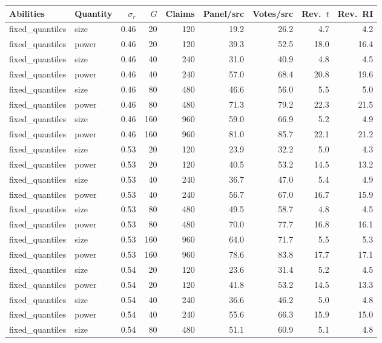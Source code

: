 \begin{table}[p]
\centering\scriptsize
\setlength{\tabcolsep}{4pt}
\begin{tabular}{@{}llrrrrrrr@{}}
\toprule
Abilities & Quantity & $\sigma_r$ & $G$ & Claims & Panel/src & Votes/src & Rev.\ $t$ & Rev.\ RI \\
\midrule
fixed\_quantiles & size & 0.46 & 20 & 120 & 19.2 & 26.2 & 4.7 & 4.2 \\
fixed\_quantiles & power & 0.46 & 20 & 120 & 39.3 & 52.5 & 18.0 & 16.4 \\
fixed\_quantiles & size & 0.46 & 40 & 240 & 31.0 & 40.9 & 4.8 & 4.5 \\
fixed\_quantiles & power & 0.46 & 40 & 240 & 57.0 & 68.4 & 20.8 & 19.6 \\
fixed\_quantiles & size & 0.46 & 80 & 480 & 46.6 & 56.0 & 5.5 & 5.0 \\
fixed\_quantiles & power & 0.46 & 80 & 480 & 71.3 & 79.2 & 22.3 & 21.5 \\
fixed\_quantiles & size & 0.46 & 160 & 960 & 59.0 & 66.9 & 5.2 & 4.9 \\
fixed\_quantiles & power & 0.46 & 160 & 960 & 81.0 & 85.7 & 22.1 & 21.2 \\
fixed\_quantiles & size & 0.53 & 20 & 120 & 23.9 & 32.2 & 5.0 & 4.3 \\
fixed\_quantiles & power & 0.53 & 20 & 120 & 40.5 & 53.2 & 14.5 & 13.2 \\
fixed\_quantiles & size & 0.53 & 40 & 240 & 36.7 & 47.0 & 5.4 & 4.9 \\
fixed\_quantiles & power & 0.53 & 40 & 240 & 56.7 & 67.0 & 16.7 & 15.9 \\
fixed\_quantiles & size & 0.53 & 80 & 480 & 49.5 & 58.7 & 4.8 & 4.5 \\
fixed\_quantiles & power & 0.53 & 80 & 480 & 70.0 & 77.7 & 16.8 & 16.1 \\
fixed\_quantiles & size & 0.53 & 160 & 960 & 64.0 & 71.7 & 5.5 & 5.3 \\
fixed\_quantiles & power & 0.53 & 160 & 960 & 78.6 & 83.8 & 17.7 & 17.1 \\
fixed\_quantiles & size & 0.54 & 20 & 120 & 23.6 & 31.4 & 5.2 & 4.5 \\
fixed\_quantiles & power & 0.54 & 20 & 120 & 41.8 & 53.2 & 14.5 & 13.3 \\
fixed\_quantiles & size & 0.54 & 40 & 240 & 36.6 & 46.2 & 5.0 & 4.8 \\
fixed\_quantiles & power & 0.54 & 40 & 240 & 55.6 & 66.3 & 15.9 & 15.0 \\
fixed\_quantiles & size & 0.54 & 80 & 480 & 51.1 & 60.9 & 5.1 & 4.8 \\

\end{tabular}
\end{table}
